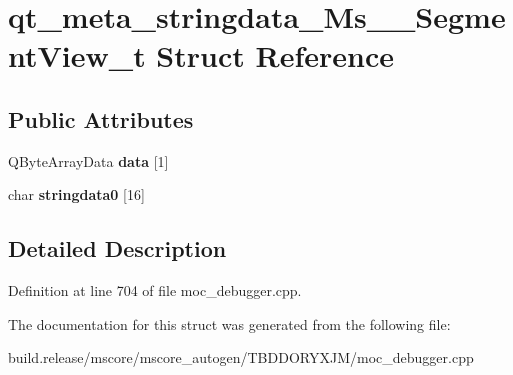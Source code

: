 \hypertarget{structqt__meta__stringdata___ms_____segment_view__t}{}\section{qt\+\_\+meta\+\_\+stringdata\+\_\+\+Ms\+\_\+\+\_\+\+Segment\+View\+\_\+t Struct Reference}
\label{structqt__meta__stringdata___ms_____segment_view__t}
\subsection*{Public Attributes}
\begin{DoxyCompactItemize}
\item 
\mbox{\label{structqt__meta__stringdata___ms_____segment_view__t_ad6a10dc1001f96b8f504dd0761507cad}} 
Q\+Byte\+Array\+Data {\bfseries data} \mbox{[}1\mbox{]}
\item 
\mbox{\label{structqt__meta__stringdata___ms_____segment_view__t_aced287e12ea761dc4ec59cd66df164cf}} 
char {\bfseries stringdata0} \mbox{[}16\mbox{]}
\end{DoxyCompactItemize}


\subsection{Detailed Description}


Definition at line 704 of file moc\+\_\+debugger.\+cpp.



The documentation for this struct was generated from the following file\+:\begin{DoxyCompactItemize}
\item 
build.\+release/mscore/mscore\+\_\+autogen/\+T\+B\+D\+D\+O\+R\+Y\+X\+J\+M/moc\+\_\+debugger.\+cpp\end{DoxyCompactItemize}
